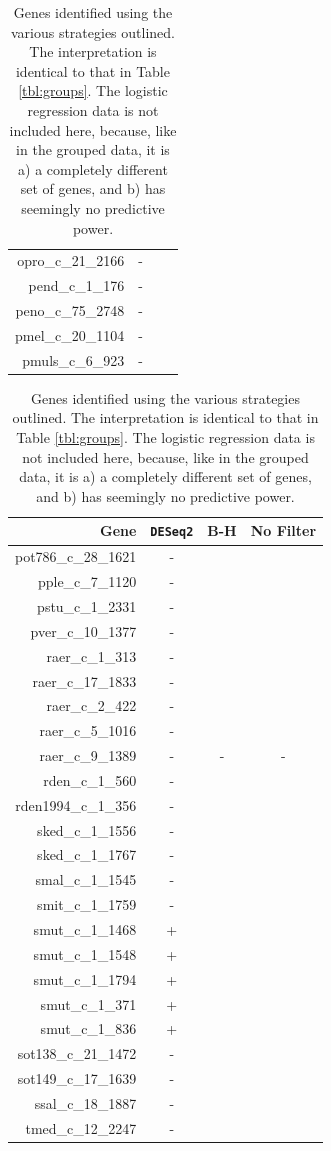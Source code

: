 \documentclass{article}
\begin{document}
\begin{table}[!h]
\begin{center}
\begin{tabular}{r|ccc}
opro\_c\_21\_2166 & - &  &   \\
  pend\_c\_1\_176 & - &  &   \\
peno\_c\_75\_2748 & - &  &   \\
pmel\_c\_20\_1104 & - &  &   \\
 pmuls\_c\_6\_923 & - &  &   
     \end{tabular}
  \begin{tabular}{r|ccc}
Gene &  \texttt{DESeq2} &   B-H & No Filter\\
\hline
 pot786\_c\_28\_1621 & - &  &   \\
 pple\_c\_7\_1120 & - &  &   \\
 pstu\_c\_1\_2331 & - &  &   \\
pver\_c\_10\_1377 & - &  &   \\
  raer\_c\_1\_313 & - &  &   \\
raer\_c\_17\_1833 & - &  &   \\
  raer\_c\_2\_422 & - &  &   \\
 raer\_c\_5\_1016 & - &  &   \\
 raer\_c\_9\_1389 & - &  - & -  \\
  rden\_c\_1\_560 & - &  &   \\
    rden1994\_c\_1\_356 & - &  &   \\
    sked\_c\_1\_1556 & - &  &   \\
    sked\_c\_1\_1767 & -  &  &   \\
smal\_c\_1\_1545 & -  &  &   \\
smit\_c\_1\_1759 & -  &  &   \\
smut\_c\_1\_1468 & +  &  &   \\
smut\_c\_1\_1548 & +  &  &   \\
smut\_c\_1\_1794 & + &  &   \\
smut\_c\_1\_371 & +  &  &   \\
smut\_c\_1\_836 & +  &  &   \\
  sot138\_c\_21\_1472 & - &  &   \\
  sot149\_c\_17\_1639 & - &  &   \\
    ssal\_c\_18\_1887 & - &  &   \\
    tmed\_c\_12\_2247 & - &  &   \\
\end{tabular}
\caption{\label{tbl:genes}Genes identified using the various strategies outlined. The interpretation is identical
to that in Table \ref{tbl:groups}. The logistic regression data is not included here, because, like in the grouped data,
it is a) a completely different set of genes, and b) has seemingly no predictive power.}
\end{center}
\end{table}
\end{document}
